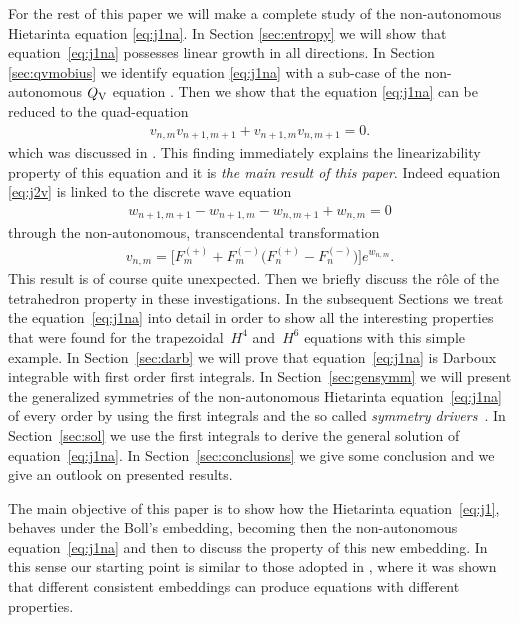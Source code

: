\documentclass[pdftex]{sigma}
\numberwithin{equation}{section}
\newcommand{\QV}{Q_{\rm V}}
\begin{document}
For the rest of this paper we will make a
complete study of the non-autonomous
Hietarinta equation \eqref{eq:j1na}.
In Section \ref{sec:entropy} we will show that equation~\eqref{eq:j1na}
possesses linear growth in all directions.
In Section \ref{sec:qvmobius} we identify equation \eqref{eq:j1na}
with a sub-case of the non-autonomous $\QV$ equation
\cite{GSL_QV}. Then we show that the equation \eqref{eq:j1na} can be
reduced to the quad-equation
\begin{gather}
 v_{n,m} v_{n+1,m+1} + v_{n+1,m}v_{n,m+1}=0.
 \label{eq:j2v}
\end{gather}
which was discussed in \cite{Hietarinta2004,Hietarinta2005}.
This f\/inding immediately explains the linearizability
property of this equation and it is \emph{the main result
of this paper}.
Indeed equation \eqref{eq:j2v} is linked to the discrete
wave equation
\begin{gather}
 w_{n+1,m+1}-w_{n+1,m}-w_{n,m+1}+w_{n,m}=0
 \label{eq:dwave}
\end{gather}
through the non-autonomous, transcendental transformation
\begin{gather}
 v_{n,m} = \big[ F^{(+)}_{m}+F^{(-)}_{m}\big(F^{(+)}_{n}-F^{(-)}_{n} \big)\big] e^{w_{n,m}}. \label{eq:transcwave}
\end{gather}
This result is of course quite unexpected.
Then we brief\/ly discuss the r\^ole of the tetrahedron property
in these investigations.
In the subsequent Sections we treat the equation~\eqref{eq:j1na} into detail in order to show all the interesting
properties that were found for the trapezoidal~$H^{4}$ and~$H^{6}$ equations
\cite{GSL_general,GSL_Gallipoli15,GSL_symmetries,GSL_QV,GSY_DarbouxI,GSY_DarbouxII}
with this simple example.
In Section~\ref{sec:darb} we will prove that equation~\eqref{eq:j1na}
is Darboux integrable with f\/irst order f\/irst integrals.
In Section~\ref{sec:gensymm} we will present
the generalized symmetries of the non-autonomous
Hietarinta equation~\eqref{eq:j1na} of every
order by using the f\/irst integrals and the so
called \emph{symmetry drivers}~\cite{Startsev2016}.
In Section~\ref{sec:sol} we use the f\/irst integrals to derive
the general solution of equation~\eqref{eq:j1na}.
In Section~\ref{sec:conclusions} we give some
conclusion and we give an outlook on presented results.

The main objective of this paper is to show how
the Hietarinta equation~\eqref{eq:j1},
behaves under the Boll's embedding,
becoming then the non-autonomous equation~\eqref{eq:j1na}
and then to discuss the property of this new embedding.
In this sense our starting point is similar to those
adopted in \cite{HietarintaViallet2012}, where it
was shown that dif\/ferent consistent embeddings
can produce equations with dif\/ferent properties.
\end{document}
